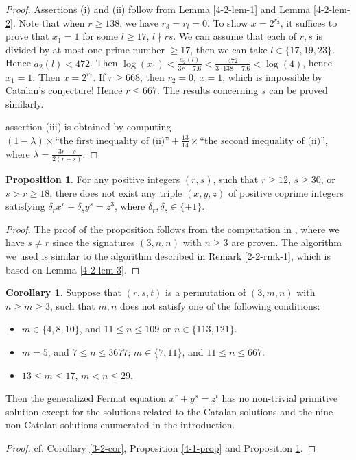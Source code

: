 \documentclass[a4paper, 12pt]{article}
\numberwithin{equation}{section}
\theoremstyle{definition}
\newtheorem{prop}[thm]{Proposition}
\newtheorem{cor}[thm]{Corollary}
\begin{document}
\begin{proof}
Assertions (i) and (ii) follow from Lemma \ref{4-2-lem-1} and Lemma \ref{4-2-lem-2}. Note that when $r \ge 138$, we have $r_3 = r_l = 0$. 
To show $x = 2^{r_2}$, it suffices to prove that $x_1 = 1$ for some $l\ge 17$, $l\nmid rs$. We can assume that each of $r,s$ is divided by at most one prime number $\ge 17$, then we can take $l\in\{17,19,23\}$. Hence $a_2(l) < 472$.
Then $\log(x_1) < \frac{a_2(l)}{3r - 7.6} < \frac{472}{3\cdot 138 - 7.6} < \log(4)$, hence $x_1 = 1$. Then $x = 2^{r_2}$. If $r\ge 668$, then $r_2 = 0$, $x=1$, which is impossible by Catalan's conjecture! Hence $r \le 667$. The results concerning $s$ can be proved similarly.

assertion (iii) is obtained by computing $(1- \lambda )\times \text{``the first inequality of (ii)''} + \frac{13}{14}\times \text{``the second inequality of (ii)''}$, where $\lambda = \frac{3r-s}{2(r+s)}$.
\end{proof}

\begin{prop} \label{4-2-prop}
For any positive integers $(r,s)$, such that $r \ge 12$, $s\ge 30$, or $s > r\ge 18$, there does not exist any triple $(x, y, z)$ of positive coprime integers satisfying  $\delta_r x^r + \delta_s y^s =  z^3$, where $\delta_r,\delta_s \in \{\pm 1\}$. 
\end{prop}
\begin{proof}
The proof of the proposition follows from the computation in \cite{Diophantine_after_IUT_I}, where we have $s \neq r$ since the signatures $(3,n,n)$ with $n\ge 3$ are proven.
The algorithm we used is similar to the algorithm described in Remark \ref{2-2-rmk-1}, which is based on Lemma \ref{4-2-lem-3}.
\end{proof}

\begin{cor} \label{4-2-cor}
Suppose that $(r,s,t)$ is a permutation of $(3,m,n)$ with $n\ge m \ge 3$, such that $m, n$ does not satisfy one of the following conditions:
\begin{itemize}
\item $m\in \{4,8,10\}$, and  $11\le n \le 109$ or $n\in \{113, 121\}$.
\item $m = 5$, and $7 \le n \le 3677$; $m\in \{7, 11\}$, and $11 \le n \le 667$.
\item $13 \le m \le 17$, $m < n \le 29$.
\end{itemize}
Then the generalized Fermat equation $x^r + y^s = z^t$ has no non-trivial primitive solution except for the solutions related to the Catalan solutions and the nine non-Catalan solutions enumerated in the introduction.
\end{cor}
\begin{proof}
cf. Corollary \ref{3-2-cor}, Proposition \ref{4-1-prop} and Proposition \ref{4-2-prop}.
\end{proof}
\end{document}
